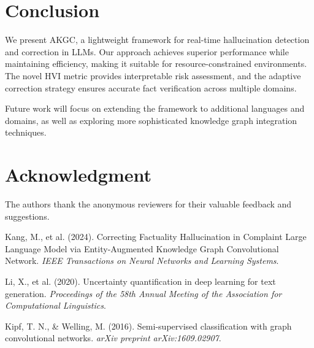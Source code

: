 \documentclass[conference]{IEEEtran}
\begin{document}
\section{Conclusion}
We present AKGC, a lightweight framework for real-time hallucination detection and correction in LLMs. Our approach achieves superior performance while maintaining efficiency, making it suitable for resource-constrained environments. The novel HVI metric provides interpretable risk assessment, and the adaptive correction strategy ensures accurate fact verification across multiple domains.

Future work will focus on extending the framework to additional languages and domains, as well as exploring more sophisticated knowledge graph integration techniques.

\section*{Acknowledgment}
The authors thank the anonymous reviewers for their valuable feedback and suggestions.

\begin{thebibliography}{00}
Kang, M., et al. (2024). Correcting Factuality Hallucination in Complaint Large Language Model via Entity-Augmented Knowledge Graph Convolutional Network. \textit{IEEE Transactions on Neural Networks and Learning Systems}.

Li, X., et al. (2020). Uncertainty quantification in deep learning for text generation. \textit{Proceedings of the 58th Annual Meeting of the Association for Computational Linguistics}.

Kipf, T. N., \& Welling, M. (2016). Semi-supervised classification with graph convolutional networks. \textit{arXiv preprint arXiv:1609.02907}.
\end{thebibliography}
\end{document}

